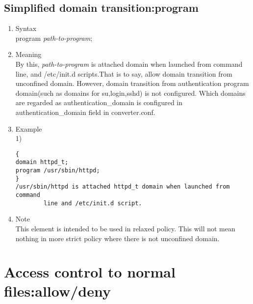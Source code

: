 \documentclass{article}
\begin{document}
\subsection{Simplified domain transition:program}\label{sec:program}
\begin{enumerate}
 \item Syntax\\
    program {\it path-to-program};
 \item Meaning\\
       By this,
       {\it path-to-program} is attached domain when launched from
       command line, and /etc/init.d scripts.That is to
       say, allow domain transition from unconfined domain. 
    However, domain transition from authentication program domain(such as
       domains for su,login,sshd) is not configured. Which domains are
       regarded as authentication\_domain is configured in
       authentication\_domain field in converter.conf.\\
 \item Example\\
1)
\begin{verbatim}
{
domain httpd_t;
program /usr/sbin/httpd;
}
/usr/sbin/httpd is attached httpd_t domain when launched from command
		line and /etc/init.d script.
\end{verbatim}
 \item Note\\
    This element is intended to be used in relaxed policy. This will not
       mean nothing in more strict policy where there is not unconfined domain.
\end{enumerate}


\section{Access control to normal files:allow/deny}
\end{document}
